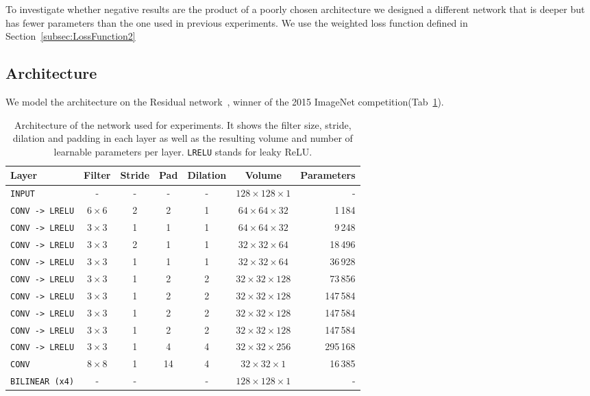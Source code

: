 To investigate whether negative results are the product of a poorly chosen architecture we designed a different network that is deeper but has fewer parameters than the one used in previous experiments. We use the weighted loss function defined in Section~\ref{subsec:LossFunction2}

\subsection{Architecture}
We model the architecture on the Residual network~\cite{He2015b}, winner of the 2015 ImageNet competition(Tab~\ref{tab:convNetArchitecture3}).

\begin{table}[h]
	\centering
	\begin{tabular}{lcccccr}
	\hline
	\textbf{Layer} & \textbf{Filter} & \textbf{Stride} & \textbf{Pad} & \textbf{Dilation} & \textbf{Volume} & \textbf{Parameters} \\
	\hline
	\texttt{INPUT}	&- & -	& - & - & $128 \times 128 \times 1$ & -\\
	\texttt{CONV -> LRELU}	& $6 \times 6$ & 2 & 2 & 1 & $64 \times 64 \times 32$ & 1\,184\\
	\texttt{CONV -> LRELU}	& $3 \times 3$ & 1 & 1 & 1 & $64 \times 64 \times 32$ & 9\,248\\
	\texttt{CONV -> LRELU}	& $3 \times 3$ & 2 & 1 & 1 & $32 \times 32 \times 64$ & 18\,496\\
	\texttt{CONV -> LRELU}	& $3 \times 3$ & 1 & 1 & 1 & $32 \times 32 \times 64$ & 36\,928\\
	\texttt{CONV -> LRELU}	& $3 \times 3$ & 1 & 2 & 2 & $32 \times 32 \times 128$ & 73\,856\\
	\texttt{CONV -> LRELU}	& $3 \times 3$ & 1 & 2 & 2 & $32 \times 32 \times 128$ & 147\,584\\
	\texttt{CONV -> LRELU}	& $3 \times 3$ & 1 & 2 & 2 & $32 \times 32 \times 128$ & 147\,584\\
	\texttt{CONV -> LRELU}	& $3 \times 3$ & 1 & 2 & 2 & $32 \times 32 \times 128$ & 147\,584\\
	\texttt{CONV -> LRELU}	& $3 \times 3$ & 1 & 4 & 4 & $32 \times 32 \times 256$ & 295\,168\\
	\texttt{CONV}	& $8 \times 8$ & 1 & 14 & 4 & $32 \times 32 \times 1$ & 16\,385\\
	\texttt{BILINEAR (x4)}		& - & - && - & $128 \times 128 \times 1$ & -\\
	\hline
	\end{tabular}
	\caption[Convolutional network architecture for Experiment 3]{Architecture of the network used for experiments. It shows the filter size, stride, dilation and padding in each layer as well as the resulting volume and number of learnable parameters per layer. \texttt{LRELU} stands for leaky ReLU.}
	\label{tab:convNetArchitecture3}
\end{table}

